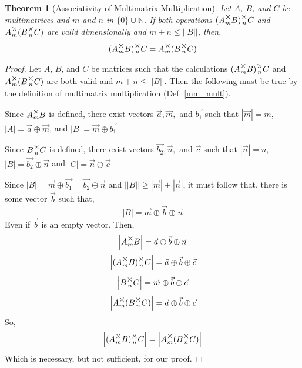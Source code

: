 \documentclass[12pt]{book}
\theoremstyle{plain}
\newtheorem{theorem}{Theorem}[chapter]
\theoremstyle{definition}
\theoremstyle{ppart}
\theoremstyle{case}
\theoremstyle{solution}
\newcommand{\mmult}[1]{\text{\raisebox{1ex}{$\underset{#1}{\times}$}}}
\newcommand{\shape}[1]{\left|#1\right|}
\begin{document}
\begin{theorem}[Associativity of Multimatrix Multiplication]
\label{mm_associativity}
Let $A$, $B$, and $C$ be multimatrices and $m$ and $n$ in
$\{0\} \cup \mathbb{N}$.
If both operations $(A \mmult{m} B) \mmult{n} C$ and $A \mmult{m} (B \mmult{n} C)$
are valid dimensionally and $m+n \le \shape{\shape{B}}$, then,
\[ (A \mmult{m} B) \mmult{n} C = A \mmult{m} (B \mmult{n} C) \]
\end{theorem}
\begin{proof}
Let $A$, $B$, and $C$ be matrices such that the calculations
$(A \mmult{m} B) \mmult{n} C$ and $A \mmult{m} (B \mmult{n} C)$ are both valid
and $m + n \le \shape{\shape{B}}$.
Then the following must be true by the definition of multimatrix multiplication
(Def. \ref{mm_mult}).

Since $A \mmult{m} B$ is defined, there exist vectors $\vec{a}, \vec{m},$ and
$\vec{b_1}$ such that 
$\shape{\vec{m}} = m$,
$\shape{A} = \vec{a} \oplus \vec{m}$,
and
$\shape{B} = \vec{m} \oplus \vec{b_1}$

Since $B \mmult{n} C$ is defined, there exist vectors $\vec{b_2}, \vec{n},$ and
$\vec{c}$ such that
$\shape{\vec{n}} = n$,
$\shape{B} = \vec{b_2} \oplus \vec{n}$
and
$\shape{C} = \vec{n} \oplus \vec{c}$

Since $\shape{B} = \vec{m} \oplus \vec{b_1} = \vec{b_2} \oplus \vec{n}$ and
$\shape{\shape{B}} \ge \shape{\vec{m}} + \shape{\vec{n}}$, it must follow that, there is some vector $\vec{b}$
such that,
\[
 \shape{B} = \vec{m} \oplus \vec{b} \oplus \vec{n}
\]
Even if $\vec{b}$ is an empty vector. Then,
\[ \shape{A \mmult{m} B} = \vec{a} \oplus \vec{b} \oplus \vec{n} \]
\[ \shape{(A \mmult{m} B) \mmult{n} C} = \vec{a} \oplus \vec{b} \oplus \vec{c} \]
\[ \shape{B \mmult{n} C} = \vec{m} \oplus \vec{b} \oplus \vec{c} \]
\[ \shape{A \mmult{m} (B \mmult{n} C)} = \vec{a} \oplus \vec{b} \oplus \vec{c} \]
So,
\[ \shape{(A \mmult{m} B) \mmult{n} C} = \shape{A \mmult{m} (B \mmult{n} C)} \]
Which is necessary, but not sufficient, for our proof.


\end{proof}
\end{document}
